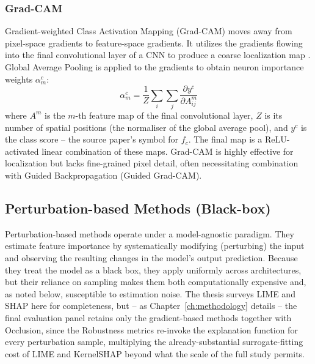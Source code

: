 \subsubsection{Grad-CAM}
Gradient-weighted Class Activation Mapping (Grad-CAM) moves away from pixel-space gradients to feature-space gradients. It utilizes the gradients flowing into the final convolutional layer of a CNN to produce a coarse localization map \cite{selvaraju2017grad}. Global Average Pooling is applied to the gradients to obtain neuron importance weights $\alpha_m^c$:
\begin{equation}
    \alpha_m^c = \frac{1}{Z} \sum_i \sum_j \frac{\partial y^c}{\partial A_{ij}^m}
\end{equation}
where $A^m$ is the $m$-th feature map of the final convolutional layer, $Z$ is its number of spatial positions (the normaliser of the global average pool), and $y^c$ is the class score -- the source paper's symbol for $f_c$. The final map is a ReLU-activated linear combination of these maps. Grad-CAM is highly effective for localization but lacks fine-grained pixel detail, often necessitating combination with Guided Backpropagation (Guided Grad-CAM).

\subsection{Perturbation-based Methods (Black-box)}
Perturbation-based methods operate under a model-agnostic paradigm. They estimate feature importance by systematically modifying (perturbing) the input and observing the resulting changes in the model's output prediction. Because they treat the model as a black box, they apply uniformly across architectures, but their reliance on sampling makes them both computationally expensive and, as noted below, susceptible to estimation noise. The thesis surveys LIME and SHAP here for completeness, but -- as Chapter~\ref{ch:methodology} details -- the final evaluation panel retains only the gradient-based methods together with Occlusion, since the Robustness metrics re-invoke the explanation function for every perturbation sample, multiplying the already-substantial surrogate-fitting cost of LIME and KernelSHAP beyond what the scale of the full study permits.

